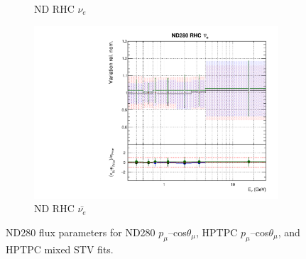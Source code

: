 \begin{figure}
\begin{subfigure}{0.45\textwidth}
  \caption{ND RHC $\nu_{e}$}
\end{subfigure}
\begin{subfigure}{0.45\textwidth}
  \centering
  \includegraphics[width=0.75\linewidth]{figs/hptpcfitsflux_7}
  \caption{ND RHC $\bar{\nu_e}$}
\end{subfigure}
\caption{ND280 flux parameters for ND280 $p_{\mu}$--cos$\theta_{\mu}$, HPTPC $p_{\mu}$--cos$\theta_{\mu}$, and HPTPC mixed STV fits.}
\label{fig:hptpcfluxND}
\end{figure}

